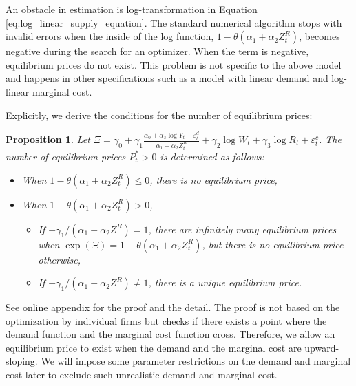 \documentclass[11pt, a4paper]{article}
\newtheorem{proposition}{Proposition}
\begin{document}
An obstacle in estimation is log-transformation in Equation \eqref{eq:log_linear_supply_equation}.
The standard numerical algorithm stops with invalid errors when the inside of the log function, $1 - \theta (\alpha_1 + \alpha_2 Z^{R}_{t})$, becomes negative during the search for an optimizer.
When the term is negative, equilibrium prices do not exist. 
This problem is not specific to the above model and happens in other specifications such as a model with linear demand and log-linear marginal cost.

Explicitly, we derive the conditions for the number of equilibrium prices:

\begin{proposition}\label{prop:equilibrium_existence}
    Let $\Xi = \gamma_0 + \gamma_1\frac{\alpha_0 + \alpha_3 \log Y_t + \varepsilon^{d}_{t}}{\alpha_1 + \alpha_2 Z^{R}_{t}} +  \gamma_2 \log W_{t} + \gamma_3 \log R_t + \varepsilon^{c}_{t}$.
    The number of equilibrium prices $P_t^*>0$ is determined as follows:
    \begin{itemize}
        \item When $1 - \theta (\alpha_1 + \alpha_2 Z^{R}_{t}) \le 0$, there is no equilibrium price,
        \item When $1 - \theta (\alpha_1 + \alpha_2 Z^{R}_{t}) >0$, 
        \begin{itemize}
            \item If $-\gamma_1/(\alpha_1+\alpha_2 Z^R) =1$, there are infinitely many equilibrium prices when $\exp(\Xi) = 1 - \theta (\alpha_1 + \alpha_2 Z^{R}_{t})$, but there is no equilibrium price otherwise,
            \item If $-\gamma_1/(\alpha_1+\alpha_2 Z^R) \ne 1$, there is a unique equilibrium price.
        \end{itemize}
    \end{itemize}
\end{proposition}
See online appendix for the proof and the detail.
The proof is not based on the optimization by individual firms but checks if there exists a point where the demand function and the marginal cost function cross.
Therefore, we allow an equilibrium
price to exist when the demand and the marginal cost are upward-sloping.
We will impose some parameter restrictions on the demand and marginal cost later to exclude such unrealistic demand and marginal cost.
\end{document}
